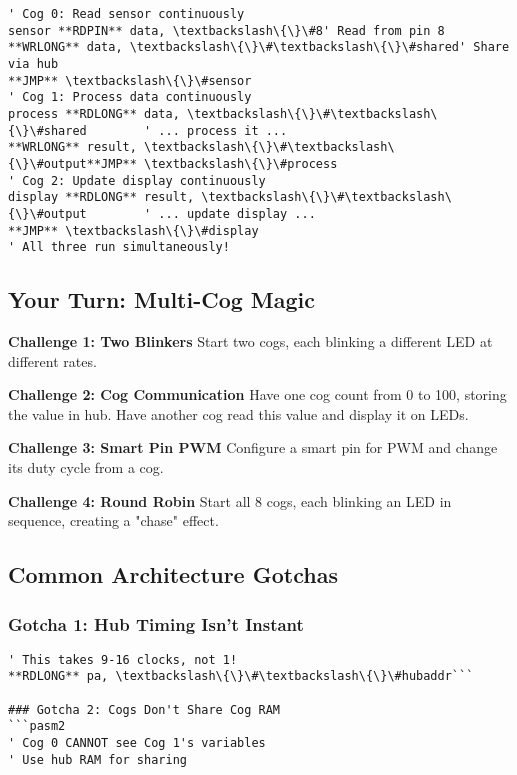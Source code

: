 \documentclass[11pt]{book}
\begin{document}
\begin{lstlisting}
' Cog 0: Read sensor continuously
sensor **RDPIN** data, \textbackslash\{\}\#8' Read from pin 8
**WRLONG** data, \textbackslash\{\}\#\textbackslash\{\}\#shared' Share via hub
**JMP** \textbackslash\{\}\#sensor
' Cog 1: Process data continuously  
process **RDLONG** data, \textbackslash\{\}\#\textbackslash\{\}\#shared        ' ... process it ...
**WRLONG** result, \textbackslash\{\}\#\textbackslash\{\}\#output**JMP** \textbackslash\{\}\#process        
' Cog 2: Update display continuously
display **RDLONG** result, \textbackslash\{\}\#\textbackslash\{\}\#output        ' ... update display ...
**JMP** \textbackslash\{\}\#display        
' All three run simultaneously!
\end{lstlisting}

\hypertarget{your-turn-multi-cog-magic}{%
\subsection{Your Turn: Multi-Cog
Magic}\label{your-turn-multi-cog-magic}}

\begin{yourturn}
\textbf{Challenge 1: Two Blinkers}
Start two cogs, each blinking a different LED at different rates.

\textbf{Challenge 2: Cog Communication}
Have one cog count from 0 to 100, storing the value in hub. Have another cog read this value and display it on LEDs.

\textbf{Challenge 3: Smart Pin PWM}
Configure a smart pin for PWM and change its duty cycle from a cog.

\textbf{Challenge 4: Round Robin}
Start all 8 cogs, each blinking an LED in sequence, creating a "chase" effect.
\end{yourturn}

\hypertarget{common-architecture-gotchas}{%
\subsection{Common Architecture
Gotchas}\label{common-architecture-gotchas}}

\hypertarget{gotcha-1-hub-timing-isnt-instant}{%
\subsubsection{Gotcha 1: Hub Timing Isn't
Instant}\label{gotcha-1-hub-timing-isnt-instant}}

\begin{lstlisting}
' This takes 9-16 clocks, not 1!
**RDLONG** pa, \textbackslash\{\}\#\textbackslash\{\}\#hubaddr```

### Gotcha 2: Cogs Don't Share Cog RAM
```pasm2
' Cog 0 CANNOT see Cog 1's variables
' Use hub RAM for sharing
\end{lstlisting}
\end{document}
